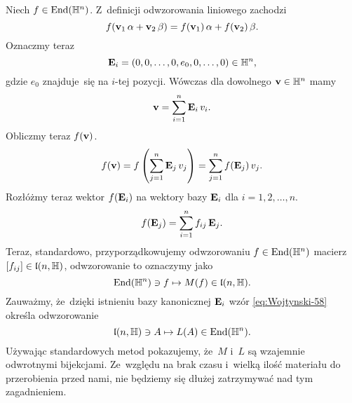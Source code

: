 \documentclass[a4paper,11pt]{article}
\begin{document}
Niech $f \in \mathrm{End}( \mathbb{H}^{ n } )$. Z~definicji odwzorowania liniowego zachodzi
\begin{equation}
  \label{eq:Wojtynski-61}
  f( \mathbf{v}_{ 1 } \, \alpha + \mathbf{v}_{ 2 } \, \beta ) =
  f( \mathbf{v}_{ 1 } ) \, \alpha + f( \mathbf{v}_{ 2 } ) \, \beta.
\end{equation}
Oznaczmy teraz
\begin{equation}
  \label{eq:Wojtynski-62}
  \mathbf{E}_{ i } = ( 0, 0, \ldots, 0, e_{ 0 }, 0, \ldots, 0 ) \in \mathbb{H}^{ n },
\end{equation}
gdzie $e_{ 0 }$ znajduje~się na $i$-tej pozycji. Wówczas dla dowolnego
$\mathbf{v} \in \mathbb{H}^{ n }$ mamy
\begin{equation}
  \label{eq:Wojtynski-63}
  \mathbf{v} = \sum_{ i = 1 }^{ n } \mathbf{E}_{ i } \, v_{ i }.
\end{equation}
Obliczmy teraz $f( \mathbf{v} )$.
\begin{equation}
  \label{eq:Wojtynski-64}
  f( \mathbf{v} ) =
  f\left( \sum_{ j = 1 }^{ n } \mathbf{E}_{ j } \, v_{ j } \right) =
  \sum_{ j = 1 }^{ n } f( \mathbf{E}_{ j } ) \, v_{ j }.
\end{equation}
Rozłóżmy teraz wektor $f( \mathbf{E}_{ i } )$ na wektory bazy
$\mathbf{E}_{ i }$ dla $i = 1, 2, \ldots, n$.
\begin{equation}
  \label{eq:Wojtynski-65}
  f( \mathbf{E}_{ j } ) = \sum_{ i = 1 }^{ n } f_{ i j } \, \mathbf{E}_{ j }.
\end{equation}
Teraz, standardowo, przyporządkowujemy odwzorowaniu $f \in \mathrm{End}( \mathbb{H}^{ n } )$
macierz $[ f_{ i j } ] \in \mathfrak{l}( n, \mathbb{H} )$, odwzorowanie to oznaczymy jako
\begin{equation}
  \label{eq:Wojtynski-66}
  \mathrm{End}( \mathbb{H}^{ n } ) \ni f \mapsto M( f ) \in \mathfrak{l}( n, \mathbb{H} ).
\end{equation}
Zauważmy, że~dzięki istnieniu bazy kanonicznej $\mathbf{E}_{ i }$ wzór
\eqref{eq:Wojtynski-58} określa odwzorowanie
\begin{equation}
  \label{eq:Wojtynski-67}
  \mathfrak{l}( n, \mathbb{H} ) \ni A \mapsto L( A ) \in \mathrm{End}( \mathbb{H}^{ n } ).
\end{equation}
Używając standardowych metod pokazujemy, że~$M$ i~$L$ są wzajemnie
odwrotnymi bijekcjami. Ze~względu na brak czasu i~wielką ilość materiału do
przerobienia przed nami, nie będziemy się dłużej zatrzymywać nad tym
zagadnieniem.
\end{document}
